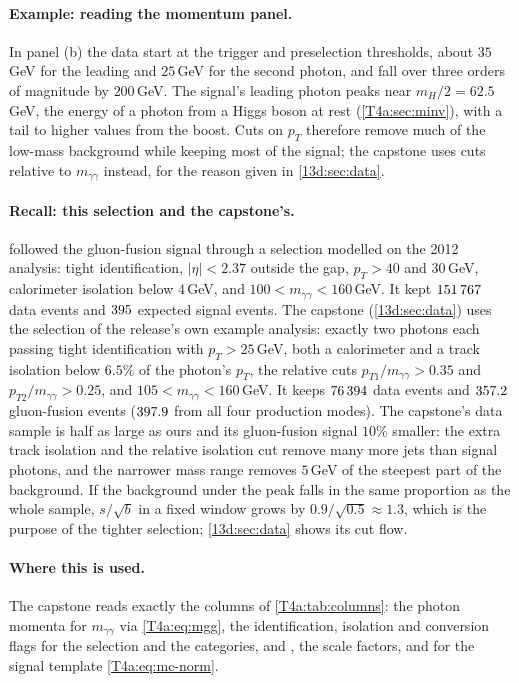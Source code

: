 \paragraph{Example: reading the momentum panel.}
In panel (b) the data start at the trigger and preselection thresholds, about $35$\,GeV for the leading and $25$\,GeV for the second photon, and fall over three orders of magnitude by $200$\,GeV. The signal's leading photon peaks near $m_H/2=62.5$\,GeV, the energy of a photon from a Higgs boson at rest (\cref{T4a:sec:minv}), with a tail to higher values from the boost. Cuts on $p_T$ therefore remove much of the low-mass background while keeping most of the signal; the capstone uses cuts relative to $m_{\gamma\gamma}$ instead, for the reason given in \cref{13d:sec:data}.

\paragraph{Recall: this selection and the capstone's.}
 followed the gluon-fusion signal through a selection modelled on the 2012 analysis: tight identification, $\lvert\eta\rvert<2.37$ outside the gap, $p_T>40$ and $30$\,GeV, calorimeter isolation below $4$\,GeV, and $100<m_{\gamma\gamma}<160$\,GeV. It kept $\num{151767}$ data events and $395$ expected signal events. The capstone (\cref{13d:sec:data}) uses the selection of the release's own example analysis: exactly two photons each passing tight identification with $p_T>25$\,GeV, both a calorimeter and a track isolation below $6.5\%$ of the photon's $p_T$, the relative cuts $p_{T1}/m_{\gamma\gamma}>0.35$ and $p_{T2}/m_{\gamma\gamma}>0.25$, and $105<m_{\gamma\gamma}<160$\,GeV. It keeps $\num{76394}$ data events and $357.2$ gluon-fusion events ($397.9$ from all four production modes). The capstone's data sample is half as large as ours and its gluon-fusion signal $10\%$ smaller: the extra track isolation and the relative isolation cut remove many more jets than signal photons, and the narrower mass range removes $5$\,GeV of the steepest part of the background. If the background under the peak falls in the same proportion as the whole sample, $s/\sqrt b$ in a fixed window grows by $0.9/\sqrt{0.5}\approx1.3$, which is the purpose of the tighter selection; \cref{13d:sec:data} shows its cut flow.

\paragraph{Where this is used.}
The capstone reads exactly the columns of \cref{T4a:tab:columns}: the photon momenta for $m_{\gamma\gamma}$ via \eqref{T4a:eq:mgg}, the identification, isolation and conversion flags for the selection and the categories, and , the scale factors,  and  for the signal template \eqref{T4a:eq:mc-norm}.
